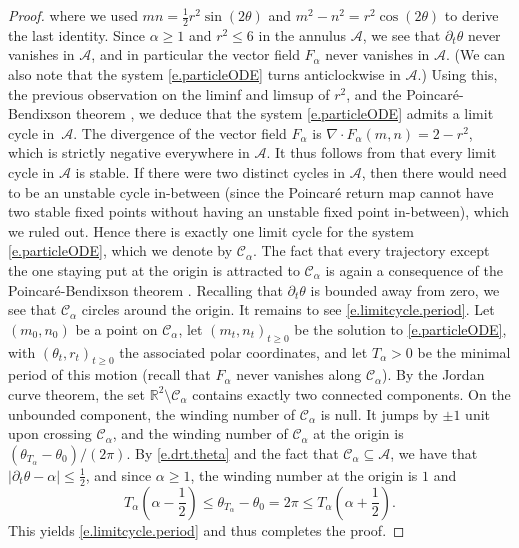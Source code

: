 \documentclass[11pt]{amsart}
\theoremstyle{remark}
\theoremstyle{definition}
\numberwithin{equation}{section}
\numberwithin{proposition}{section}
\newcommand{\R}{\mathbb{R}}
\renewcommand{\le}{\leqslant}
\renewcommand{\ge}{\geqslant}
\renewcommand{\subset}{\subseteq}
\newcommand{\Ll}{\left}
\newcommand{\Rr}{\right}
\newcommand{\dr}{\partial}
\newcommand{\1}{\mathbf{1}}
\newcommand{\mcl}{\mathcal}
\newcommand{\msc}{\mathscr}
\newcommand{\al}{\alpha}
\begin{document}
\begin{proof}
where we used $mn = \tfrac 1 2 r^2 \sin (2\theta)$ and $m^2 - n^2 =  r^2 \cos(2\theta)$ to derive the last identity. Since $\al \ge 1$ and $r^2 \le 6$ in the annulus $\mcl A$, we see that $\dr_t \theta$ never vanishes in $\mcl A$, and in particular the vector field $F_\al$ never vanishes in $\mcl A$. (We can also note that the system \eqref{e.particleODE} turns anticlockwise in $\mcl A$.) Using this, the previous observation on the liminf and limsup of $r^2$, and the Poincar\'e-Bendixson theorem \cite[Theorem 3.7.1]{perko2001differential}, we deduce that the system \eqref{e.particleODE} admits a limit cycle in~$\mcl A$. The divergence of the vector field $F_\al$ is $\nabla \cdot F_\al(m,n) = 2-r^2$, which is strictly negative everywhere in $\mcl A$. It thus follows from \cite[Theorem~3.4.2]{perko2001differential} that every limit cycle in $\mcl A$ is stable. If there were two distinct cycles in $\mcl A$, then there would need to be an unstable cycle in-between (since the Poincaré return map \cite[Section~3.4]{perko2001differential} cannot have two stable fixed points without having an unstable fixed point in-between), which we ruled out. Hence there is exactly one limit cycle for the system \eqref{e.particleODE}, which we denote by $\msc C_\al$. The fact that every trajectory except the one staying put at the origin is attracted to $\msc C_\al$ is again a consequence of the Poincar\'e-Bendixson theorem \cite[Theorem 3.7.1]{perko2001differential}. Recalling that $\dr_t \theta$ is bounded away from zero, we see that $\msc C_\al$ circles around the origin. It remains to see \eqref{e.limitcycle.period}. Let $(m_0, n_0)$ be a point on $\msc C_\al$, let $(m_t, n_t)_{t \ge 0}$ be the solution to \eqref{e.particleODE}, with $(\theta_t, r_t)_{t \ge 0}$ the associated polar coordinates, and let $T_\al > 0$ be the minimal period of this motion (recall that $F_\al$ never vanishes along $\msc C_\al$). By the Jordan curve theorem, the set $\R^2 \setminus \msc C_\al$ contains exactly two connected components. On the unbounded component, the winding number of $\msc C_\al$ is null. It jumps by $\pm 1$ unit upon crossing $\msc C_\al$, and the winding number of $\msc C_\al$ at the origin is $(\theta_{T_{\al}} - \theta_0)/(2\pi)$. By \eqref{e.drt.theta} and the fact that $\msc C_\al \subset \mcl A$, we have that $|\dr_t \theta - \al| \le \frac 1 2$, and since $\al \ge 1$, the winding number at the origin is $1$ and
\begin{equation*}  %
T_\al \Ll( \al - \frac 1 2 \Rr) \le {\theta_{T_{\al}} - \theta_0} = 2\pi \le T_\al \Ll( \al + \frac 1 2 \Rr) .
\end{equation*}
This yields \eqref{e.limitcycle.period} and thus completes the proof.
\end{proof}
\end{document}
